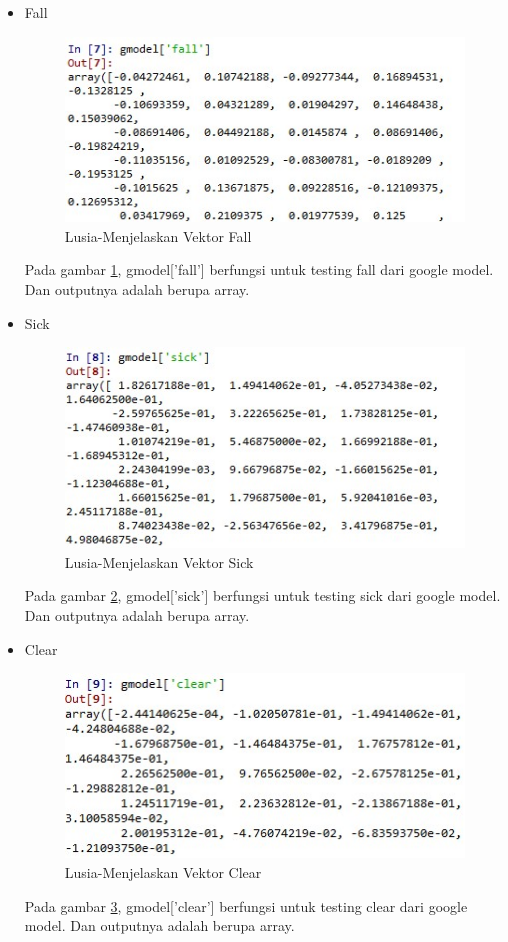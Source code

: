 \begin{enumerate}
\begin{enumerate}
\begin{itemize}
				\item Fall
				\begin{figure}[ht]
					\centering
					\includegraphics[scale=0.39]{figures/chap5c.jpg}
					\caption{Lusia-Menjelaskan Vektor Fall}
					\label{5b4}
					\end{figure}
					\par Pada gambar \ref{5b4}, gmodel['fall'] berfungsi untuk testing fall dari google model. Dan outputnya adalah berupa array. 
					
				\item Sick
					\begin{figure}[ht]
					\centering
					\includegraphics[scale=0.37]{figures/chap5d.jpg}
					\caption{Lusia-Menjelaskan Vektor Sick}
					\label{5b5}
					\end{figure}
					\par Pada gambar \ref{5b5}, gmodel['sick'] berfungsi untuk testing sick dari google model. Dan outputnya adalah berupa array. 
					
				\item Clear
					\begin{figure}[ht]
					\centering
					\includegraphics[scale=0.4]{figures/chap5e.jpg}
					\caption{Lusia-Menjelaskan Vektor Clear}
					\label{5b6}
					\end{figure}
					\par Pada gambar \ref{5b6}, gmodel['clear'] berfungsi untuk testing clear dari google model. Dan outputnya adalah berupa array. 
					

\end{itemize}
\end{enumerate}
\end{enumerate}
